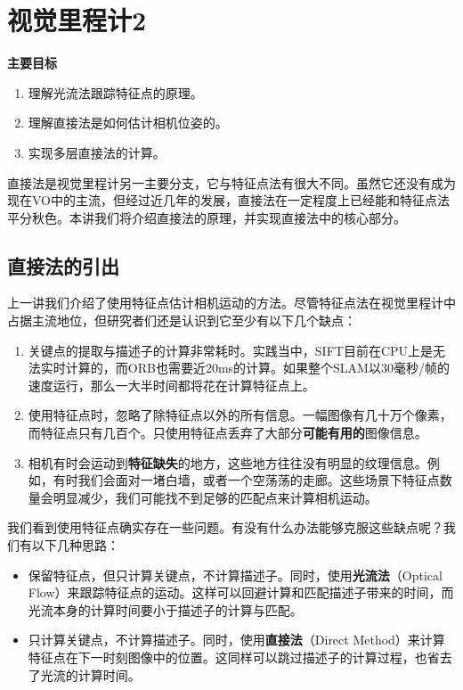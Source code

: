 \chapter{视觉里程计2}
\label{cpt:vo2}
\begin{mdframed}  
	\textbf{主要目标}
	\begin{enumerate}[labelindent=0em,leftmargin=1.5em]
		\item 理解光流法跟踪特征点的原理。
		\item 理解直接法是如何估计相机位姿的。
		\item 实现多层直接法的计算。
	\end{enumerate}
\end{mdframed}

直接法是视觉里程计另一主要分支，它与特征点法有很大不同。虽然它还没有成为现在VO中的主流，但经过近几年的发展，直接法在一定程度上已经能和特征点法平分秋色。本讲我们将介绍直接法的原理，并实现直接法中的核心部分。

\newpage


\newpage
\section{直接法的引出}
上一讲我们介绍了使用特征点估计相机运动的方法。尽管特征点法在视觉里程计中占据主流地位，但研究者们还是认识到它至少有以下几个缺点：

\begin{enumerate}
	\item 关键点的提取与描述子的计算非常耗时。实践当中，SIFT目前在CPU上是无法实时计算的，而ORB也需要近20ms的计算。如果整个SLAM以30毫秒/帧的速度运行，那么一大半时间都将花在计算特征点上。
	
	\item 使用特征点时，忽略了除特征点以外的所有信息。一幅图像有几十万个像素，而特征点只有几百个。只使用特征点丢弃了大部分\textbf{可能有用的}图像信息。
	
	\item 相机有时会运动到\textbf{特征缺失}的地方，这些地方往往没有明显的纹理信息。例如，有时我们会面对一堵白墙，或者一个空荡荡的走廊。这些场景下特征点数量会明显减少，我们可能找不到足够的匹配点来计算相机运动。 
\end{enumerate}

我们看到使用特征点确实存在一些问题。有没有什么办法能够克服这些缺点呢？我们有以下几种思路：

\begin{itemize}
	\item 保留特征点，但只计算关键点，不计算描述子。同时，使用\textbf{光流法}（Optical Flow）来跟踪特征点的运动。这样可以回避计算和匹配描述子带来的时间，而光流本身的计算时间要小于描述子的计算与匹配。
	\item 只计算关键点，不计算描述子。同时，使用\textbf{直接法}（Direct Method）来计算特征点在下一时刻图像中的位置。这同样可以跳过描述子的计算过程，也省去了光流的计算时间。
\end{itemize}

